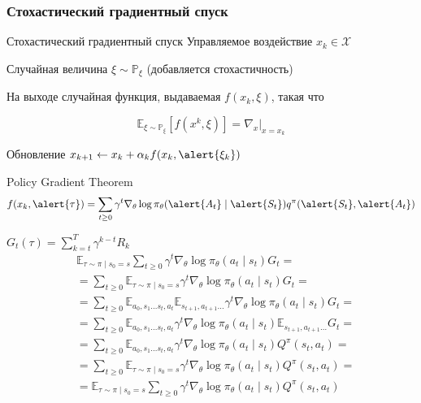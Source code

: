 \documentclass[notheorems]{beamer} %
\begin{document}
\begin{frame}
	\frametitle{Стохастический градиентный спуск}
	
	\begin{block}{Стохастический градиентный спуск}
		Управляемое воздействие  $x_k \in \mathcal{X}$
		
		Случайная величина $\xi \sim \mathbb{P}_\xi$ (добавляется стохастичность)
		
		На выходе случайная функция, выдаваемая  $f(x_k, \xi)$, такая что
		
		$$ \mathbb{E}_{\xi \sim \mathbb{P}_\xi}[ f(x^k, \xi) ] = \nabla_x|_{x=x_k} $$
		
		
		Обновление $ x_{k+1} \leftarrow x_k  +\alpha_k f(x_k, \alert{\xi_k}) $
	\end{block}

	\begin{block}{Policy Gradient Theorem}
		$$ f(x_k, \alert{\tau})= \sum_{t \ge 0} \gamma^t \nabla_{\theta} \log \pi_\theta (\alert{A_t} \mid \alert{S_t}) q^{\pi}(\alert{S_t}, \alert{A_t}) $$
	\end{block}
\end{frame}

\begin{frame}
	$G_t(\tau )= \sum_{k = t}^{T} \gamma^{k - t} R_{k}$
	\begin{align*}
	 & \mathbb{E}_{\tau \sim \pi \mid s_0 = s} \sum_{t \ge 0} \gamma^t \nabla_{\theta} \log \pi_\theta (a_t \mid s_t) G_t = \\
	&= \sum_{t \ge 0} \mathbb{E}_{\tau \sim \pi \mid s_0 = s} \gamma^t \nabla_{\theta} \log \pi_\theta (a_t \mid s_t) G_t = \\
	&= \sum_{t \ge 0} \mathbb{E}_{a_0, s_1 \dots s_t, a_t} \mathbb{E}_{s_{t+1}, a_{t+1} \dots} \gamma^t \nabla_{\theta} \log \pi_\theta (a_t \mid s_t) G_t = \\
	&= \sum_{t \ge 0} \mathbb{E}_{a_0, s_1 \dots s_t, a_t} \gamma^t \nabla_{\theta} \log \pi_\theta (a_t \mid s_t)  \mathbb{E}_{s_{t+1}, a_{t+1} \dots} G_t = \\
	&= \sum_{t \ge 0} \mathbb{E}_{a_0, s_1 \dots s_t, a_t} \gamma^t \nabla_{\theta} \log \pi_\theta (a_t \mid s_t) Q^\pi(s_t, a_t) = \\
	&= \sum_{t \ge 0} \mathbb{E}_{\tau \sim \pi \mid s_0 = s} \gamma^t \nabla_{\theta} \log \pi_\theta (a_t \mid s_t) Q^\pi(s_t, a_t) = \\
	&= \mathbb{E}_{\tau \sim \pi \mid s_0 = s} \sum_{t \ge 0} \gamma^t \nabla_{\theta} \log \pi_\theta (a_t \mid s_t) Q^\pi(s_t, a_t)  
	\end{align*}
\end{frame}	
\end{document}

